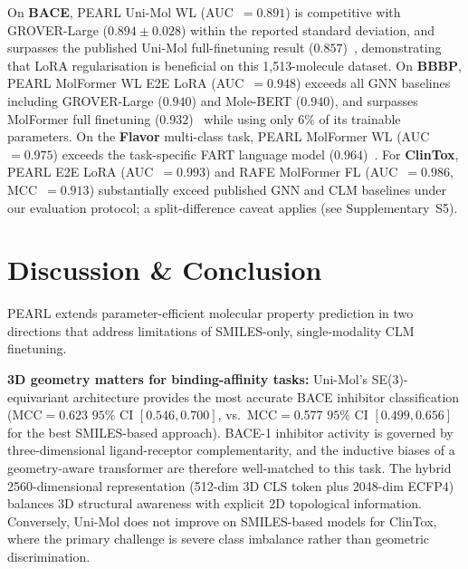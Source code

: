 \documentclass[pdflatex,sn-mathphys-num]{sn-jnl}%
\theoremstyle{thmstyleone}%
\theoremstyle{thmstyletwo}%
\theoremstyle{thmstylethree}%
\begin{document}
On \textbf{BACE}, PEARL Uni-Mol WL (AUC~$= 0.891$) is competitive with GROVER-Large ($0.894 \pm 0.028$) within the reported standard deviation, and surpasses the published Uni-Mol full-finetuning result ($0.857$)~\cite{zhou2023unimol}, demonstrating that LoRA regularisation is beneficial on this 1{,}513-molecule dataset. On \textbf{BBBP}, PEARL MolFormer WL E2E LoRA (AUC~$= 0.948$) exceeds all GNN baselines including GROVER-Large ($0.940$) and Mole-BERT ($0.940$), and surpasses MolFormer full finetuning ($0.932$)~\cite{ross2022molformer} while using only $6\%$ of its trainable
parameters. On the \textbf{Flavor} multi-class task, PEARL MolFormer WL (AUC~$= 0.975$) exceeds the task-specific FART language model ($0.964$)~\cite{zimmermann2024fart}. For \textbf{ClinTox}, PEARL E2E LoRA (AUC~$= 0.993$) and RAFE MolFormer FL
(AUC~$= 0.986$, MCC~$= 0.913$) substantially exceed published GNN and CLM baselines
under our evaluation protocol; a split-difference caveat applies (see Supplementary~S5).

\section{Discussion \& Conclusion}
PEARL extends parameter-efficient molecular property prediction in two directions that address limitations of SMILES-only, single-modality CLM finetuning. 

\textbf{3D geometry matters for binding-affinity tasks:}
Uni-Mol's SE(3)-equivariant architecture provides the most accurate BACE inhibitor classification (MCC$=$0.623 $95\%$ CI $[0.546, 0.700]$, vs.\ MCC$=$0.577 $95\%$ CI $[0.499, 0.656]$ for the best SMILES-based approach). BACE-1 inhibitor activity is governed by three-dimensional ligand-receptor complementarity, and the inductive biases of a geometry-aware transformer are therefore well-matched to this task. The hybrid 2560-dimensional representation (512-dim 3D CLS token plus 2048-dim ECFP4) balances 3D structural awareness with explicit 2D topological information. Conversely, Uni-Mol does not improve on SMILES-based models for ClinTox, where the primary challenge is severe class imbalance rather than geometric discrimination.
\end{document}
